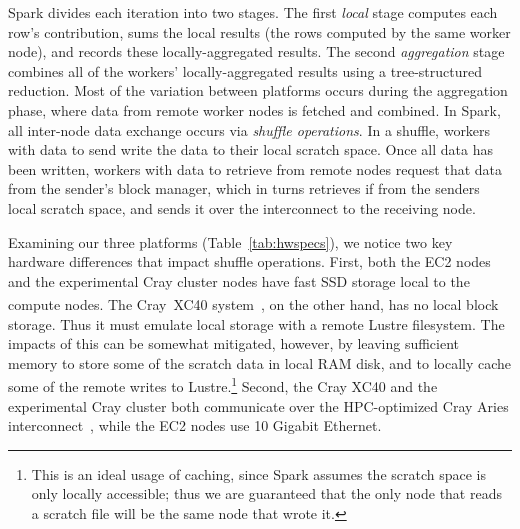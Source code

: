 Spark divides each iteration into two stages.  The first \emph{local} stage computes each row's contribution, sums the local results (the rows computed by the same worker node), and records these locally-aggregated results.  The second \emph{aggregation} stage combines all of the workers' locally-aggregated results using a tree-structured reduction.  Most of the variation between platforms occurs during the aggregation phase, where data from remote worker nodes is fetched and combined.  In Spark, all inter-node data exchange occurs via \emph{shuffle operations}.  In a shuffle, workers with data to send write the data to their local scratch space.  Once all data has been written, workers with data to retrieve from remote nodes request that data from the sender's block manager, which in turns retrieves if from the senders local scratch space, and sends it over the interconnect to the receiving node.

Examining our three platforms (Table~\ref{tab:hwspecs}), we notice two key hardware differences that impact shuffle operations.  First, both the EC2 nodes and the experimental Cray cluster nodes have fast SSD storage local to the compute nodes.  The Cray\textregistered~XC40\textsuperscript{\tiny\texttrademark} system~\cite{alverson2012cray,craycascadesc12}, on the other hand, has no local block storage.  Thus it must emulate local storage with a remote Lustre filesystem.  The impacts of this can be somewhat mitigated, however, by leaving sufficient memory to store some of the scratch data in local RAM disk, and to locally cache some of the remote writes to Lustre.\footnote{This is an ideal usage of caching, since Spark assumes the scratch space is only locally accessible; thus we are guaranteed that the only node that reads a scratch file will be the same node that wrote it.}  Second, the Cray XC40 and the experimental Cray cluster both communicate over the HPC-optimized Cray Aries 
interconnect~\cite{alverson2012cray}, while the EC2 nodes use 10 Gigabit Ethernet.  

